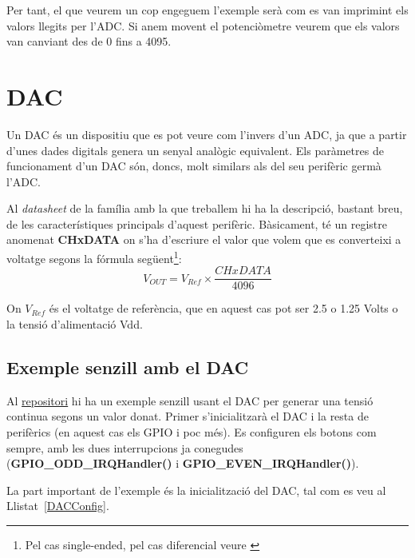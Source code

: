 Per tant, el que veurem un cop engeguem l'exemple serà com es van imprimint els valors llegits per l'\gls{ADC}. Si anem movent el potenciòmetre veurem que els valors van canviant des de 0 fins a 4095.

\chapter{DAC}
\label{sub:DAC}
Un \gls{DAC} és un dispositiu que es pot veure com l'invers d'un ADC, ja que a partir d'unes dades digitals genera un senyal analògic equivalent. Els paràmetres de funcionament d'un DAC són, doncs, molt similars als del seu perifèric germà l'\gls{ADC}.

Al {\em datasheet} de la família amb la que treballem \cite[421]{EFM32GRM} hi ha la descripció, bastant breu, de les característiques principals d'aquest perifèric. Bàsicament, té un registre anomenat {\bf CHxDATA} on s'ha d'escriure el valor que volem que es converteixi a voltatge segons la fórmula següent\footnote{Pel cas single-ended, pel cas diferencial veure \cite[424]{EFM32GRM}}:
\begin{equation}
\label{eq:DACFormula}
 V_{OUT} = V_{Ref} \times \frac{CHxDATA}{4096}
\end{equation}

On $V_{Ref}$ és el voltatge de referència, que en aquest cas pot ser 2.5 o 1.25 Volts o la tensió d'alimentació Vdd.

\section{Exemple senzill amb el DAC}
\label{sec:DAC_Example_1}

Al \href{https://github.com/mariusmm/cursembedded/tree/master/Simplicity/DAC_1}{repositori} hi ha un exemple senzill usant el DAC per generar una tensió continua segons un valor donat.
Primer s'inicialitzarà el \gls{DAC} i la resta de perifèrics (en aquest cas els GPIO i poc més). Es configuren els botons com sempre, amb les dues interrupcions ja conegudes ({\bf GPIO\_ODD\_IRQHandler()} i {\bf GPIO\_EVEN\_IRQHandler()}).

La part important de l'exemple és la inicialització del DAC, tal com es veu al Llistat~\ref{DACConfig}.

